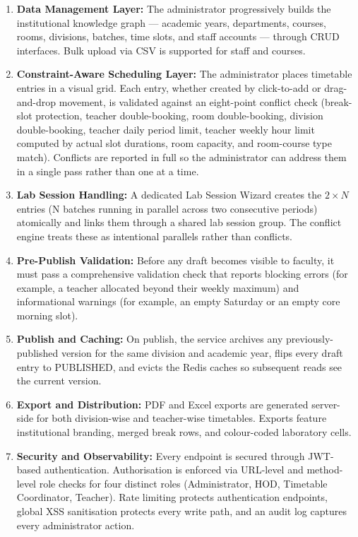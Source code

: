 \begin{enumerate}
    \item \textbf{Data Management Layer:} The administrator progressively builds the institutional knowledge graph --- academic years, departments, courses, rooms, divisions, batches, time slots, and staff accounts --- through CRUD interfaces. Bulk upload via CSV is supported for staff and courses.
    \item \textbf{Constraint-Aware Scheduling Layer:} The administrator places timetable entries in a visual grid. Each entry, whether created by click-to-add or drag-and-drop movement, is validated against an eight-point conflict check (break-slot protection, teacher double-booking, room double-booking, division double-booking, teacher daily period limit, teacher weekly hour limit computed by actual slot durations, room capacity, and room-course type match). Conflicts are reported in full so the administrator can address them in a single pass rather than one at a time.
    \item \textbf{Lab Session Handling:} A dedicated Lab Session Wizard creates the $2 \times N$ entries (N batches running in parallel across two consecutive periods) atomically and links them through a shared lab session group. The conflict engine treats these as intentional parallels rather than conflicts.
    \item \textbf{Pre-Publish Validation:} Before any draft becomes visible to faculty, it must pass a comprehensive validation check that reports blocking errors (for example, a teacher allocated beyond their weekly maximum) and informational warnings (for example, an empty Saturday or an empty core morning slot).
    \item \textbf{Publish and Caching:} On publish, the service archives any previously-published version for the same division and academic year, flips every draft entry to PUBLISHED, and evicts the Redis caches so subsequent reads see the current version.
    \item \textbf{Export and Distribution:} PDF and Excel exports are generated server-side for both division-wise and teacher-wise timetables. Exports feature institutional branding, merged break rows, and colour-coded laboratory cells.
    \item \textbf{Security and Observability:} Every endpoint is secured through JWT-based authentication. Authorisation is enforced via URL-level and method-level role checks for four distinct roles (Administrator, HOD, Timetable Coordinator, Teacher). Rate limiting protects authentication endpoints, global XSS sanitisation protects every write path, and an audit log captures every administrator action.
\end{enumerate}

